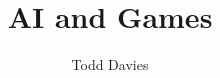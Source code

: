 \newcommand{\coursename}{AI and Games}
\newcommand{\coursecode}{COMP34120}
\newcommand{\courseinfo}{}
\newcommand{\Author}{Todd Davies} 
\newcommand{\Title}{AI and Games}
\author{\Author}
\title{\Title}
